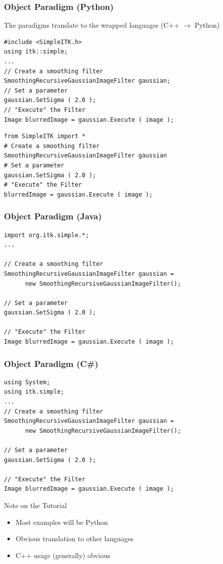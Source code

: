 \begin{frame}[fragile]
\frametitle{Object Paradigm (Python)}
The paradigms translate to the wrapped languages (C++ $\rightarrow$ Python)
\lstcpp
\begin{lstlisting}
#include <SimpleITK.h>
using itk::simple;
...
// Create a smoothing filter
SmoothingRecursiveGaussianImageFilter gaussian;
// Set a parameter
gaussian.SetSigma ( 2.0 );
// "Execute" the Filter
Image blurredImage = gaussian.Execute ( image );
\end{lstlisting}
\lstpython
\begin{lstlisting}
from SimpleITK import *
# Create a smoothing filter
SmoothingRecursiveGaussianImageFilter gaussian
# Set a parameter
gaussian.SetSigma ( 2.0 );
# "Execute" the Filter
blurredImage = gaussian.Execute ( image );
\end{lstlisting}
\end{frame}

\begin{frame}[fragile]
\frametitle{Object Paradigm (Java)}
\lstjava
\begin{lstlisting}
import org.itk.simple.*;
...

// Create a smoothing filter
SmoothingRecursiveGaussianImageFilter gaussian =
      new SmoothingRecursiveGaussianImageFilter();

// Set a parameter
gaussian.SetSigma ( 2.0 );

// "Execute" the Filter
Image blurredImage = gaussian.Execute ( image );
\end{lstlisting}
\end{frame}


\begin{frame}[fragile]
\frametitle{Object Paradigm (C\#)}
\lstjava
\begin{lstlisting}
using System;
using itk.simple;
...
// Create a smoothing filter
SmoothingRecursiveGaussianImageFilter gaussian =
      new SmoothingRecursiveGaussianImageFilter();

// Set a parameter
gaussian.SetSigma ( 2.0 );

// "Execute" the Filter
Image blurredImage = gaussian.Execute ( image );
\end{lstlisting}
\end{frame}


\begin{frame}{Note on the Tutorial}
\begin{itemize}
  \item Most examples will be Python
  \item Obvious translation to other languages
  \item C++ usage (generally) obvious
\end{itemize}
\end{frame}

